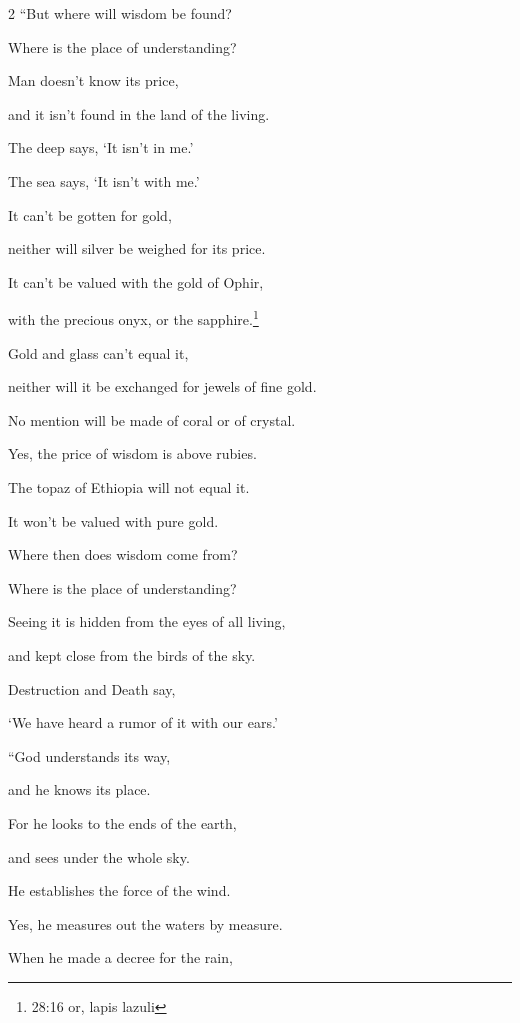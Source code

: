 \begin{multicols}{2}
	\myverse{}“But where will wisdom be found?
	
	Where is the place of understanding?
	
	\myverse{}Man doesn’t know its price,
	
	and it isn’t found in the land of the living.
	
	\myverse{}The deep says, ‘It isn’t in me.’
	
	The sea says, ‘It isn’t with me.’
	
	\myverse{}It can’t be gotten for gold,
	
	neither will silver be weighed for its price.
	
	\myverse{}It can’t be valued with the gold of Ophir,
	
	with the precious onyx, or the sapphire.\footnote{28:16 or, lapis lazuli}
	
	\myverse{}Gold and glass can’t equal it,
	
	neither will it be exchanged for jewels of fine gold.
	
	\myverse{}No mention will be made of coral or of crystal.
	
	Yes, the price of wisdom is above rubies.
	
	\myverse{}The topaz of Ethiopia will not equal it.
	
	It won’t be valued with pure gold.
	
	\myverse{}Where then does wisdom come from?
	
	Where is the place of understanding?
	
	\myverse{}Seeing it is hidden from the eyes of all living,
	
	and kept close from the birds of the sky.
	
	\myverse{}Destruction and Death say,
	
	‘We have heard a rumor of it with our ears.’
	
		\vspace{\baselineskip}
	
	\myverse{}“God understands its way,
	
	and he knows its place.
	
	\myverse{}For he looks to the ends of the earth,
	
	and sees under the whole sky.
	
	\myverse{}He establishes the force of the wind.
	
	Yes, he measures out the waters by measure.
	
	\myverse{}When he made a decree for the rain,
	

\end{multicols}
